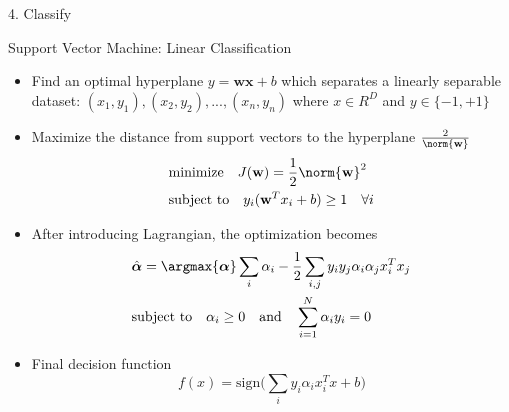 \begin{frame}{4. Classify}
\end{frame}

\begin{frame}{Support Vector Machine: Linear Classification}
	\begin{itemize}
		\item Find an optimal hyperplane $y = \mathbf{w} \mathbf{x} + b$  which separates a linearly separable dataset: ${(x_{1}, y_{1}), (x_{2}, y_{2}), ..., (x_{n}, y_{n})}$ where $x \in R^{D}$ and $y \in  \{ -1, +1 \}$

		\item Maximize the distance from support vectors to the hyperplane $\frac{2}{\norm{\mathbf{w}}}$
		  \begin{eqnarray}
		  & \text{minimize} \quad J(\mathbf{w}) = \frac{1}{2} \norm{\mathbf{w}}^2 \nonumber \\
		  & \text{subject to} \quad y_i (\mathbf{w}^{T} x_i + b) \ge 1 \quad \forall i
		  \end{eqnarray}

		\item After introducing Lagrangian, the optimization becomes
		  \begin{eqnarray}
		  & \hat{\boldsymbol{\alpha}} = \argmax{\boldsymbol{\alpha}} \sum_i \alpha_i - \frac{1}{2} \sum_{i,j} y_i y_j \alpha_i \alpha_j x_i^{T} x_j \nonumber\\
		  & \text{subject to} \quad \alpha_i \ge 0  \quad \text{and} \quad \sum_{i=1}^{N} \alpha_i y_i = 0
		  \end{eqnarray}

		\item Final decision function
		  \begin{equation}
		  f(x) = \text{sign}\bigg(\sum_i y_i \alpha_i x_i^T x + b\bigg)
		  \end{equation}
	\end{itemize}
\end{frame}

